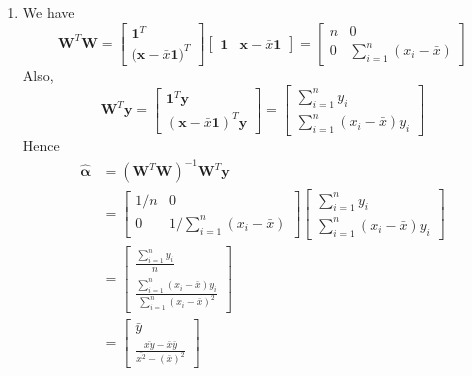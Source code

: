 \documentclass{article}
\begin{document}
\begin{enumerate}[leftmargin = 0 em, label = \arabic*., font = \bfseries]
\begin{enumerate}
		\item 
		We have
		\[\bm W^T \bm W = \begin{bmatrix}
			\bm 1^T\\
			\bm (\bm x - \bar{x} \bm 1)^T
		\end{bmatrix} \begin{bmatrix}
			\bm 1 & \bm x - \bar{x} \bm 1
		\end{bmatrix} = \begin{bmatrix}
			n & 0\\
			0 & \sum_{i=1}^n (x_i - \bar{x})
		\end{bmatrix}\]
Also,
\[\bm W^T \bm y = \begin{bmatrix}
	\bm 1 ^T \bm y \\
	(\bm x - \bar{x} \bm 1)^T \bm y
\end{bmatrix} = \begin{bmatrix}
	\sum_{i=1}^n y_i\\
	\sum_{i=1}^n (x_i - \bar{x})y_i
\end{bmatrix}\]
Hence 
\begin{align*}
\hat{\bm \alpha} &= (\bm W^T \bm W)^{-1}\bm W^T \bm y\\
& = \begin{bmatrix}
			1/n & 0\\
			0 & 1/\sum_{i=1}^n (x_i - \bar{x})
		\end{bmatrix} \begin{bmatrix}
	\sum_{i=1}^n y_i\\
	\sum_{i=1}^n (x_i - \bar{x})y_i
\end{bmatrix} \\
& = \begin{bmatrix}
	\frac{\sum_{i=1}^n y_i}{n}\\
	\frac{\sum_{i=1}^n (x_i - \bar{x})y_i}{\sum_{i=1}^n (x_i - \bar{x})^2}
\end{bmatrix}\\
& = \begin{bmatrix}
	\bar{y}\\
	\frac{\bar{xy} - \bar{x} \bar{y}}{\bar{x^2} - (\bar{x})^2}
\end{bmatrix}
\end{align*}


\end{enumerate}
\end{enumerate}
\end{document}
